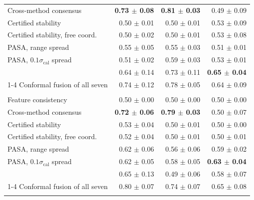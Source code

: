 \begin{tabular}{@{}lrrr@{}}
Cross-method consensus & \textbf{0.73 $\pm$ 0.08} & \textbf{0.81 $\pm$ 0.03} & 0.49 $\pm$ 0.09 \\
Certified stability & 0.50 $\pm$ 0.01 & 0.50 $\pm$ 0.01 & 0.53 $\pm$ 0.09 \\
Certified stability, free coord. & 0.50 $\pm$ 0.02 & 0.50 $\pm$ 0.01 & 0.53 $\pm$ 0.08 \\
PASA, range spread & 0.55 $\pm$ 0.05 & 0.55 $\pm$ 0.03 & 0.51 $\pm$ 0.01 \\
PASA, $0.1\sigma_{\mathrm{cal}}$ spread & 0.51 $\pm$ 0.02 & 0.59 $\pm$ 0.03 & 0.53 $\pm$ 0.01 \\
\Erasecheck{} & 0.64 $\pm$ 0.14 & 0.73 $\pm$ 0.11 & \textbf{0.65 $\pm$ 0.04} \\
\cmidrule(lr){1-4}
Conformal fusion of all seven & 0.74 $\pm$ 0.12 & 0.78 $\pm$ 0.05 & 0.64 $\pm$ 0.09 \\
\addlinespace
\multicolumn{4}{@{}l}{\emph{\AttackC{}, $g$ = permutation}} \\
Feature consistency & 0.50 $\pm$ 0.00 & 0.50 $\pm$ 0.00 & 0.50 $\pm$ 0.00 \\
Cross-method consensus & \textbf{0.72 $\pm$ 0.06} & \textbf{0.79 $\pm$ 0.03} & 0.50 $\pm$ 0.07 \\
Certified stability & 0.53 $\pm$ 0.04 & 0.50 $\pm$ 0.01 & 0.50 $\pm$ 0.00 \\
Certified stability, free coord. & 0.52 $\pm$ 0.04 & 0.50 $\pm$ 0.01 & 0.50 $\pm$ 0.01 \\
PASA, range spread & 0.62 $\pm$ 0.06 & 0.56 $\pm$ 0.06 & 0.59 $\pm$ 0.02 \\
PASA, $0.1\sigma_{\mathrm{cal}}$ spread & 0.62 $\pm$ 0.05 & 0.58 $\pm$ 0.05 & \textbf{0.63 $\pm$ 0.04} \\
\Erasecheck{} & 0.65 $\pm$ 0.13 & 0.49 $\pm$ 0.06 & 0.58 $\pm$ 0.07 \\
\cmidrule(lr){1-4}
Conformal fusion of all seven & 0.80 $\pm$ 0.07 & 0.74 $\pm$ 0.07 & 0.65 $\pm$ 0.08 \\
\addlinespace
\bottomrule
\end{tabular}

